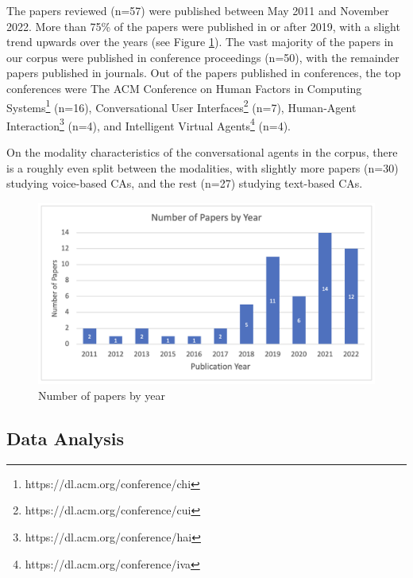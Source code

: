 \documentclass[sigconf,screen,review, anonymous]{acmart}
\begin{document}
The papers reviewed (n=57) were published between May 2011 and November 2022. More than 75\% of the papers were published in or after 2019, with a slight trend upwards over the years (see Figure \ref{fig:paper}). The vast majority of the papers in our corpus were published in conference proceedings (n=50), with the remainder papers published in journals. Out of the papers published in conferences, the top conferences were The ACM Conference on Human Factors in Computing Systems\footnote{https://dl.acm.org/conference/chi} (n=16), Conversational User Interfaces\footnote{https://dl.acm.org/conference/cui} (n=7), Human-Agent Interaction\footnote{https://dl.acm.org/conference/hai} (n=4), and Intelligent Virtual Agents\footnote{https://dl.acm.org/conference/iva} (n=4). 

On the modality characteristics of the conversational agents in the corpus, there is a roughly even split between the modalities, with slightly more papers (n=30) studying voice-based CAs, and the rest (n=27) studying text-based CAs.

\begin{figure}[h]
  \centering
  \includegraphics[width=\columnwidth]{fig-paper.png}
  \caption{Number of papers by year}
  \label{fig:paper}
\end{figure}

\subsection{Data Analysis}
\end{document}
